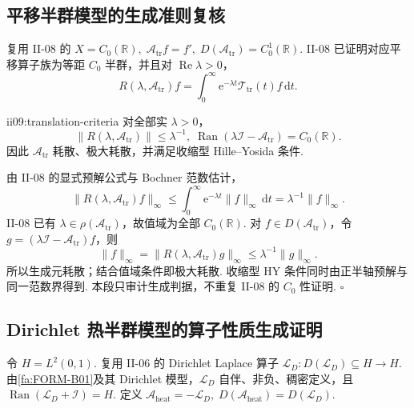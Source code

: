 \subsection{平移半群模型的生成准则复核}

复用 II-08 的 \(\displaystyle X=C_0(\mathbb R), \; \mathcal A_{\mathrm{tr}}f=f', \; D(\mathcal A_{\mathrm{tr}})=C_0^1(\mathbb R).\)
II-08 已证明对应平移算子族为等距 \(\displaystyle C_0\) 半群，并且对 \(\displaystyle\operatorname{Re}\lambda>0\)，
\[
R(\lambda,\mathcal A_{\mathrm{tr}})f
=
\int_0^\infty
\mathrm{e}^{-\lambda t}\mathcal T_{\mathrm{tr}}(t)f
\,\mathrm{d}t.
\]

\begin{FAProposition}[C][平移生成元的 HY 与 LP 复核]{ii09:translation-criteria}
对全部实 \(\displaystyle\lambda>0\)，
\[
\|R(\lambda,\mathcal A_{\mathrm{tr}})\|
\leqslant
\lambda^{-1},
\;
\operatorname{Ran}(\lambda\mathcal I-\mathcal A_{\mathrm{tr}})=C_0(\mathbb R).
\]
因此 \(\displaystyle\mathcal A_{\mathrm{tr}}\) 耗散、极大耗散，并满足收缩型 Hille--Yosida 条件.
\end{FAProposition}

\begin{FAProof}
由 II-08 的显式预解公式与 Bochner 范数估计，
\[
\|R(\lambda,\mathcal A_{\mathrm{tr}})f\|_\infty
\leqslant
\int_0^\infty\mathrm{e}^{-\lambda t}\|f\|_\infty\,\mathrm{d}t
=
\lambda^{-1}\|f\|_\infty.
\]
II-08 已有 \(\displaystyle\lambda\in\rho(\mathcal A_{\mathrm{tr}})\)，故值域为全部 \(\displaystyle C_0(\mathbb R)\). 对 \(\displaystyle f\in D(\mathcal A_{\mathrm{tr}})\)，令 \(\displaystyle g=(\lambda\mathcal I-\mathcal A_{\mathrm{tr}})f\)，则
\[
\|f\|_\infty
=
\|R(\lambda,\mathcal A_{\mathrm{tr}})g\|_\infty
\leqslant
\lambda^{-1}\|g\|_\infty.
\]
所以生成元耗散；结合值域条件即极大耗散. 收缩型 HY 条件同时由正半轴预解与同一范数界得到. 本段只审计生成判据，不重复 II-08 的 \(\displaystyle C_0\) 性证明.
\hfill\(\square\)
\end{FAProof}

\subsection{Dirichlet 热半群模型的算子性质生成证明}

令 \(\displaystyle H=L^2(0,1)\). 复用 II-06 的 Dirichlet Laplace 算子 \(\displaystyle \mathcal L_D:D(\mathcal L_D)\subseteq H\to H.\)
由\autoref{fa:FORM-B01}及其 Dirichlet 模型，\(\displaystyle\mathcal L_D\) 自伴、非负、稠密定义，且 \(\displaystyle \operatorname{Ran}(\mathcal L_D+\mathcal I)=H.\)
定义 \(\displaystyle \mathcal A_{\mathrm{heat}} =-\mathcal L_D, \; D(\mathcal A_{\mathrm{heat}})=D(\mathcal L_D).\)


